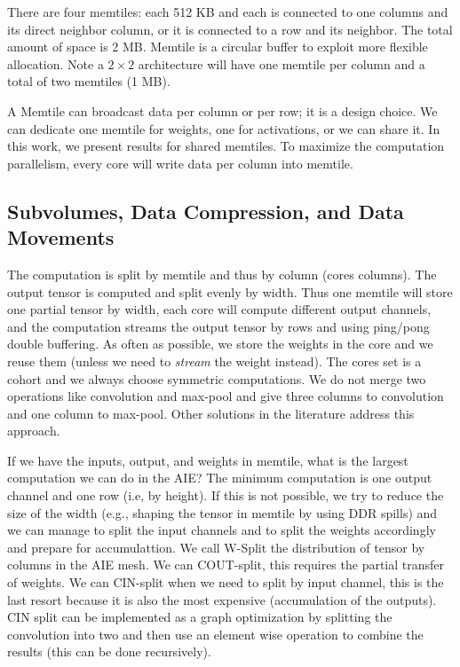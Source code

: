 \documentclass{IEEEtran}
\begin{document}
There are four memtiles: each 512 KB and each is connected to one
columns and its direct neighbor column, or it is connected to a row
and its neighbor. The total amount of space is 2 MB. Memtile is a
circular buffer to exploit more flexible allocation. Note a $2 \times
2$ architecture will have one memtile per column and a total of two
memtiles (1 MB).

A Memtile can broadcast data per column or per row; it is a design
choice. We can dedicate one memtile for weights, one for activations,
or we can share it. In this work, we present results for shared
memtiles. To maximize the computation parallelism, every core will
write data per column into memtile.


\subsection{Subvolumes, Data Compression, and Data Movements}
The computation is split by memtile and thus by column (cores
columns). The output tensor is computed and split evenly by
width. Thus one memtile will store one partial tensor by width, each
core will compute different output channels, and the computation
streams the output tensor by rows and using ping/pong double
buffering. As often as possible, we store the weights in the core and
we reuse them (unless we need to {\em stream} the weight instead). The
cores set is a cohort and we always choose symmetric computations. We
do not merge two operations like convolution and max-pool and give
three columns to convolution and one column to max-pool. Other
solutions in the literature address this approach.

If we have the inputs, output, and weights in memtile, what is the
largest computation we can do in the AIE? The minimum computation is
one output channel and one row (i.e, by height). If this is not
possible, we try to reduce the size of the width (e.g., shaping the
tensor in memtile by using DDR spills) and we can manage to split the
input channels and to split the weights accordingly and prepare for
accumulattion. We call W-Split the distribution of tensor by columns
in the AIE mesh. We can COUT-split, this requires the partial transfer
of weights.  We can CIN-split when we need to split by input channel,
this is the last resort because it is also the most expensive
(accumulation of the outputs). CIN split can be implemented as a graph
optimization by splitting the convolution into two and then use an
element wise operation to combine the results (this can be done
recursively).
\end{document}

